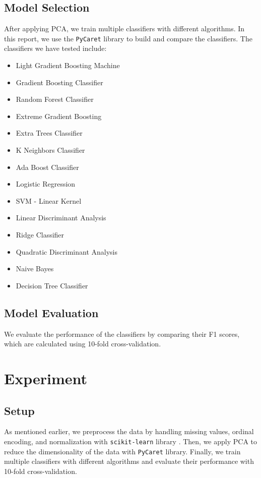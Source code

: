 \documentclass[conference]{IEEEtran}
\begin{document}
\subsection{Model Selection}

After applying PCA, we train multiple classifiers with different algorithms.
In this report, we use the \texttt{PyCaret} library \cite{PyCaret} to build and compare the classifiers.
The classifiers we have tested include:
\begin{itemize}
    \item Light Gradient Boosting Machine
    \item Gradient Boosting Classifier
    \item Random Forest Classifier
    \item Extreme Gradient Boosting
    \item Extra Trees Classifier
    \item K Neighbors Classifier
    \item Ada Boost Classifier
    \item Logistic Regression
    \item SVM - Linear Kernel
    \item Linear Discriminant Analysis
    \item Ridge Classifier
    \item Quadratic Discriminant Analysis
    \item Naive Bayes
    \item Decision Tree Classifier
\end{itemize}

\subsection{Model Evaluation}

We evaluate the performance of the classifiers by comparing their F1 scores, which are calculated using 10-fold cross-validation.

\section{Experiment}

\subsection{Setup}

As mentioned earlier, we preprocess the data by handling missing values, ordinal encoding, and normalization with \texttt{scikit-learn} library \cite{scikit-learn}.
Then, we apply PCA to reduce the dimensionality of the data with \texttt{PyCaret} library.
Finally, we train multiple classifiers with different algorithms and evaluate their performance with 10-fold cross-validation.
\end{document}
